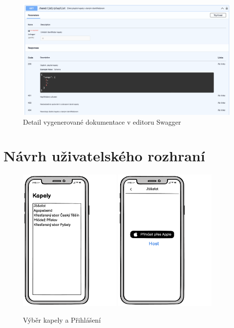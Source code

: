 \begin{figure}
    \includegraphics[width=\textwidth]{images/A-navrh-api/A-3-swagger-dokumentace-detail.png}
    \caption{Detail vygenerované dokumentace v editoru Swagger}
\end{figure}

\chapter{Návrh uživatelského rozhraní}

\begin{figure}[H]
    \includegraphics[width=0.45\textwidth]{images/B-navrh-ui/B-1-vyber-kapely.pdf}
    \includegraphics[width=0.45\textwidth]{images/B-navrh-ui/B-1-prihlaseni.pdf}
    \caption{Výběr kapely a Přihlášení}
\end{figure}

